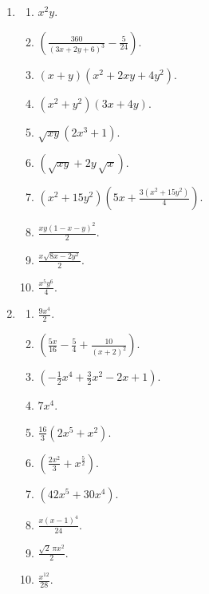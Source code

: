 \begin{enumerate}
    \item
        \begin{multicols}{2}
            \begin{enumerate}[label*=\arabic*.]
                 \item $x^{2} y$.
                 \item $\left(\frac{360}{\left(3 x+2 y+6\right)^{3}} - \frac{5}{24}\right)$.
                 \item $\left(x+y\right) \left(x^{2}+2 x y+4 y^{2}\right)$.
                 \item $\left(x^{2}+y^{2}\right) \left(3 x+4 y\right)$.
                 \item $\sqrt{x y} \left(2 x^{3} + 1\right)  $.
                 \item $\left(\sqrt{x y}+2 {{y}}\, \sqrt{ x}\right)$.
                 \item $\left(x^{2}+15 y^{2}\right)\left(5 x +\frac{3 \left(x^{2}+15 y^{2}\right)}{4}\right)$.
                 \item $\frac{x y \left(1-x-y\right)^{2}}{2}$.
                 \item $\frac{x \sqrt{8 x - 2 y^{2}}}{2}$.
                 \item $\frac{x^{5} y^{6}}{4}$.
            \end{enumerate}
        \end{multicols}
    \item
        \begin{multicols}{2}
            \begin{enumerate}[label*=\arabic*.]
                \item $\frac{9 x^{4}}{2}$.
                \item $\left(\frac{5 x}{16}-\frac{5}{4}+\frac{10}{\left(x+2\right)^{2}}\right)$.
                \item $\left(-\frac{1}{2} x^{4}+\frac{3}{2} x^{2}-2 x+1\right)$.
                \item $7 x^{4}$.
                \item $\frac{16}{3}\left(2 x^{5} + x^{2}\right)$.
                \item $\left(\frac{2 x^{2}}{3}+x^{\frac{5}{2}}\right)$.
                \item $\left(42 x^{5}+30 x^{4}\right)$.
                \item $\frac{x \left(x-1\right)^{4}}{24}$.
                \item $\frac{\sqrt{2}\, \pi x^{2} }{2}$.
                \item $\frac{x^{12}}{28}$.

\end{enumerate}
\end{multicols}
\end{enumerate}
